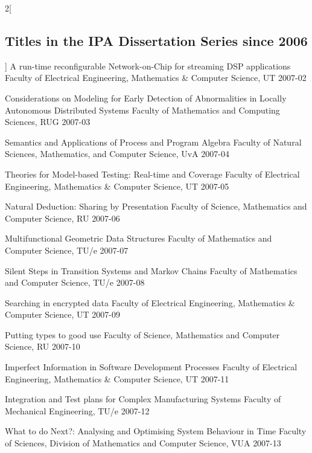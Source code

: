 \begin{multicols}{2}[\subsection*{Titles in the IPA Dissertation Series since 2006}]
         {A run-time reconfigurable Network-on-Chip for streaming DSP applications}
         {Faculty of Electrical Engineering, Mathematics \& Computer Science, UT}
         {2007-02}

         {Considerations on Modeling for Early Detection of Abnormalities in Locally Autonomous Distributed Systems}
         {Faculty of Mathematics and Computing Sciences, RUG}
         {2007-03}

         {Semantics and Applications of Process and Program Algebra}
         {Faculty of Natural Sciences, Mathematics, and Computer Science, UvA}
         {2007-04}

         {Theories for Model-based Testing: Real-time and Coverage}
         {Faculty of Electrical Engineering, Mathematics \& Computer Science, UT}
         {2007-05}

         {Natural Deduction: Sharing by Presentation}
         {Faculty of Science, Mathematics and Computer Science, RU}
         {2007-06}

         {Multifunctional Geometric Data Structures}
         {Faculty of Mathematics and Computer Science, TU/e}
         {2007-07}

         {Silent Steps in Transition Systems and Markov Chains}
         {Faculty of Mathematics and Computer Science, TU/e}
         {2007-08}

         {Searching in encrypted data}
         {Faculty of Electrical Engineering, Mathematics \& Computer Science, UT}
         {2007-09}

         {Putting types to good use}
         {Faculty of Science, Mathematics and Computer Science, RU}
         {2007-10}

         {Imperfect Information in Software Development Processes}
         {Faculty of Electrical Engineering, Mathematics \& Computer Science, UT}
         {2007-11}

         {Integration and Test plans for Complex Manufacturing Systems}
         {Faculty of Mechanical Engineering, TU/e}
         {2007-12}

         {What to do Next?: Analysing and Optimising System Behaviour in Time}
         {Faculty of Sciences, Division of Mathematics and Computer Science, VUA}
         {2007-13}


\end{multicols}
